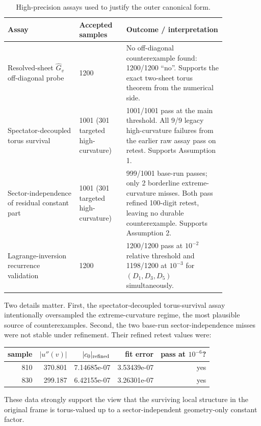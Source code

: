 \documentclass[11pt]{article}
\newcommand{\hatG}{\widehat G}
\begin{document}
\begin{table}[h]
\caption{High-precision assays used to justify the outer canonical form.}
\label{tab:numerics}

\begin{tabular}{p{0.28\linewidth}p{0.18\linewidth}p{0.39\linewidth}}
Assay & Accepted samples & Outcome / interpretation\\
\hline
Resolved-sheet $\hatG_v$ off-diagonal probe & 1200 & No off-diagonal counterexample found: 1200/1200 ``no''. Supports the exact two-sheet torus theorem from the numerical side.\\
Spectator-decoupled torus survival & 1001 (301 targeted high-curvature) & 1001/1001 pass at the main threshold. All 9/9 legacy high-curvature failures from the earlier raw assay pass on retest. Supports Assumption 1.\\
Sector-independence of residual constant part & 1001 (301 targeted high-curvature) & 999/1001 base-run passes; only 2 borderline extreme-curvature misses. Both pass refined 100-digit retest, leaving no durable counterexample. Supports Assumption 2.\\
Lagrange-inversion recurrence validation & 1200 & 1200/1200 pass at $10^{-2}$ relative threshold and 1198/1200 at $10^{-3}$ for $(D_1,D_3,D_5)$ simultaneously.\\
\end{tabular}

\end{table}

Two details matter. First, the spectator-decoupled torus-survival assay intentionally oversampled the extreme-curvature regime, the most plausible source of counterexamples. Second, the two base-run sector-independence misses were not stable under refinement. Their refined retest values were:
\begin{center}
\begin{tabular}{rrrrr}
\toprule
sample & $|u''(v)|$ & $|c_0|_{\rm refined}$ & fit error & pass at $10^{-6}$?\\
\midrule
810 & 370.801 & 7.14685e-07 & 3.53439e-07 & yes\\
830 & 299.187 & 6.42155e-07 & 3.26301e-07 & yes\\
\bottomrule
\end{tabular}
\end{center}
These data strongly support the view that the surviving local structure in the original frame is torus-valued up to a sector-independent geometry-only constant factor.
\end{document}
